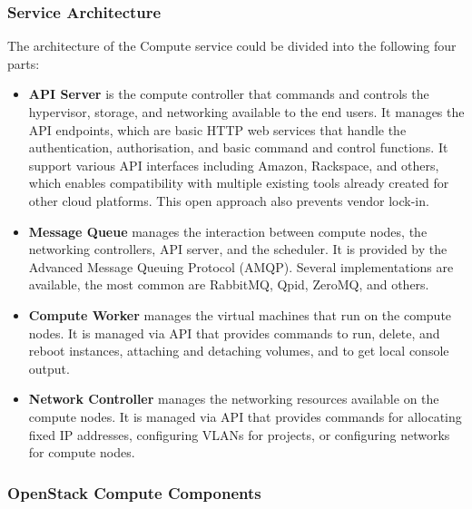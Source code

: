 \subsubsection*{Service Architecture}

The architecture of the Compute service could be divided into the following four parts:
\begin{itemize}
  \item{\textbf{API Server} is the compute controller that commands and controls the hypervisor, storage, and networking available to the end users. It manages the API endpoints, which are basic HTTP web services that handle the authentication, authorisation, and basic command and control functions. It support various API interfaces including Amazon, Rackspace, and others, which enables compatibility with multiple existing tools already created for other cloud platforms. This open approach also prevents vendor lock-in.}
  \item{\textbf{Message Queue} manages the interaction between compute nodes, the networking controllers, API server, and the scheduler. It is provided by the Advanced Message Queuing Protocol (AMQP). Several implementations are available, the most common are RabbitMQ, Qpid, ZeroMQ, and others.}
  \item{\textbf{Compute Worker} manages the virtual machines that run on the compute nodes. It is managed via API that provides commands to run, delete, and reboot instances, attaching and detaching volumes, and to get local console output.}
  \item{\textbf{Network Controller} manages the networking resources available on the compute nodes. It is managed via API that provides commands for allocating fixed IP addresses, configuring VLANs for projects, or configuring networks for compute nodes.}
  \\\cite{AdminGuide}
\end{itemize}

\subsubsection*{OpenStack Compute Components}

